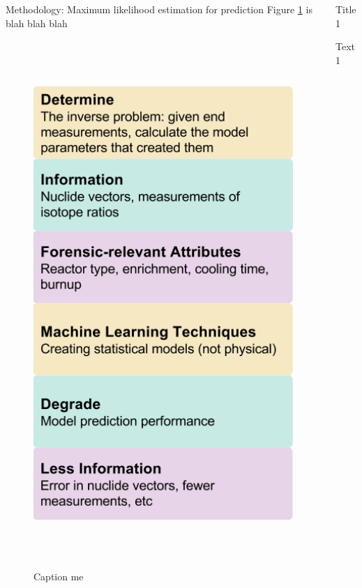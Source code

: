 \documentclass{beamer}
\begin{document}
\begin{frame}[t]{}
\begin{columns}
\begin{column}[T]{0.72\textwidth}
\begin{columns}[t]
\begin{column}{0.32\textwidth}
\begin{block}{Methodology: Maximum likelihood estimation for prediction}
Figure \ref{fig:overview} is blah blah blah

\begin{figure}
  \includegraphics[height=20cm]{figures/overview.png}
  \caption{Caption me}
  \label{fig:overview}
\end{figure}

\end{block}
\end{column}

\begin{column}{0.42\textwidth}
\begin{block}{Title1}

Text1

\end{block}
\end{column}


\end{columns}
\end{column}
\end{columns}
\end{frame}
\end{document}
